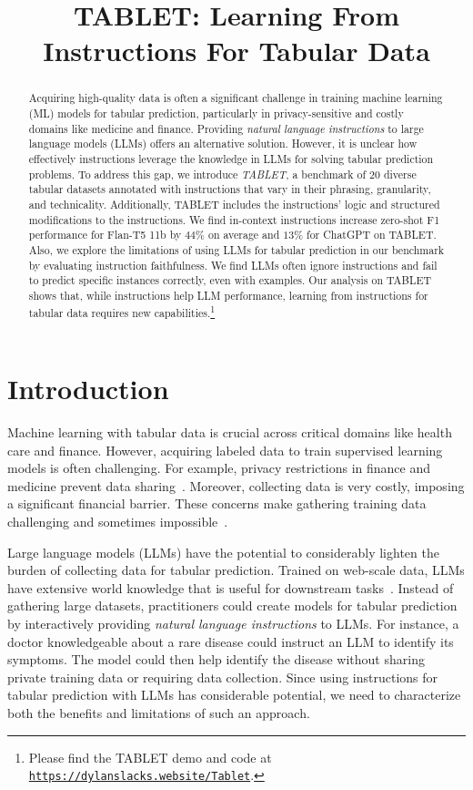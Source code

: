\title{TABLET: Learning From Instructions For Tabular Data}

\begin{abstract}
Acquiring high-quality data is often a significant challenge in training machine learning (ML) models for tabular prediction, particularly in privacy-sensitive and costly domains like medicine and finance. Providing \textit{natural language instructions} to large language models (LLMs) offers an alternative solution. However, it is unclear how effectively instructions leverage the knowledge in LLMs for solving tabular prediction problems. To address this gap, we introduce \textit{TABLET}, a benchmark of $20$ diverse tabular datasets annotated with instructions that vary in their phrasing, granularity, and technicality. Additionally, TABLET includes the instructions' logic and structured modifications to the instructions. We find in-context instructions increase zero-shot F1 performance for Flan-T5 11b by $44\%$ on average and $13\%$ for ChatGPT on TABLET. Also, we explore the limitations of using LLMs for tabular prediction in our benchmark by evaluating instruction faithfulness. We find LLMs often ignore instructions and fail to predict specific instances correctly, even with examples. Our analysis on TABLET shows that, while instructions help LLM performance, learning from instructions for tabular data requires new capabilities.\footnote{Please find the TABLET demo and code at \href{https://dylanslacks.website/Tablet}{\texttt{https://dylanslacks.website/Tablet}}.}
\end{abstract}

\section{Introduction}
\label{sec:intro}

Machine learning with tabular data is crucial across critical domains like health care and finance. However, acquiring labeled data to train supervised learning models is often challenging. For example, privacy restrictions in finance and medicine prevent data sharing~\cite{sharing-is-hard}. Moreover, collecting data is very costly, imposing a significant financial barrier. These concerns make gathering training data challenging and sometimes impossible~\cite{Murdoch2021, bigdataconsumerprivacymoothy, crawford2014big, Cath2018-aj}.

Large language models (LLMs) have the potential to considerably lighten the burden of collecting data for tabular prediction. Trained on web-scale data, LLMs have extensive world knowledge that is useful for downstream tasks~\cite{NEURIPS2020_1457c0d6}. Instead of gathering large datasets, practitioners could create models for tabular prediction by interactively providing \textit{natural language instructions} to LLMs. For instance, a doctor knowledgeable about a rare disease could instruct an LLM to identify its symptoms. The model could then help identify the disease without sharing private training data or requiring data collection. Since using instructions for tabular prediction with LLMs has considerable potential, we need to characterize both the benefits and limitations of such an approach.

